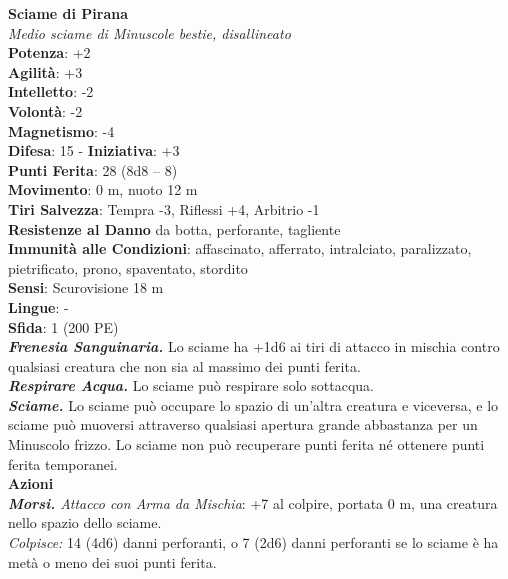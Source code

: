 \begin{multicols}{2}
\medskip\textbf{Sciame di Pirana}\\
\emph{Medio sciame di Minuscole bestie, disallineato}\\
\textbf{Potenza}: +2\\
\textbf{Agilità}: +3\\
\textbf{Intelletto}: -2\\
\textbf{Volontà}: -2\\
\textbf{Magnetismo}: -4\\
\textbf{Difesa}: 15 - \textbf{Iniziativa}: +3\\
\textbf{Punti Ferita}: 28 (8d8 -- 8)\\
\textbf{Movimento}: 0 m, nuoto 12 m\\
\textbf{Tiri Salvezza}: Tempra -3, Riflessi +4, Arbitrio -1\\
\textbf{Resistenze al Danno} da botta, perforante, tagliente\\
\textbf{Immunità alle Condizioni}: affascinato, afferrato, intralciato, paralizzato, pietrificato, prono, spaventato, stordito\\
\textbf{Sensi}: Scurovisione 18 m\\
\textbf{Lingue}: -\\
\textbf{Sfida}: 1 (200 PE)\smallskip\\
\emph{\textbf{Frenesia Sanguinaria.}} Lo sciame ha +1d6 ai tiri di attacco in mischia contro qualsiasi creatura che non sia al massimo dei punti ferita.\\
\emph{\textbf{Respirare Acqua.}} Lo sciame può respirare solo sottacqua.\\
\emph{\textbf{Sciame.}} Lo sciame può occupare lo spazio di un'altra creatura e viceversa, e lo sciame può muoversi attraverso qualsiasi apertura grande abbastanza per un Minuscolo frizzo. Lo sciame non può recuperare punti ferita né ottenere punti ferita temporanei.\\
\smallskip\textbf{Azioni}\\
\emph{\textbf{Morsi.} Attacco con Arma da Mischia}: +7 al colpire, portata 0 m, una creatura nello spazio dello sciame.\\
\emph{Colpisce:} 14 (4d6) danni perforanti, o 7 (2d6) danni perforanti se lo sciame è ha metà o meno dei suoi punti ferita.\\


\end{multicols}
